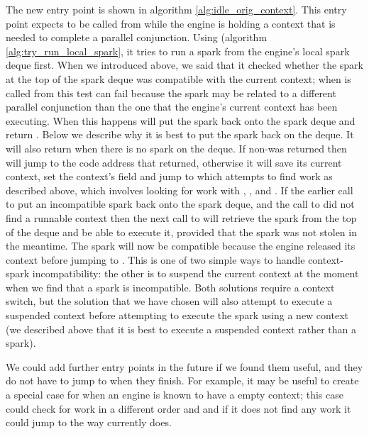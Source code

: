 The new entry point \idleorigcontext is shown in algorithm
\ref{alg:idle_orig_context}.
This entry point expects to be called from \joinandcontinue while the engine
is holding a context that is needed to complete a parallel conjunction.
Using \tryrunlocalspark (algorithm \ref{alg:try_run_local_spark},
it tries to run a spark from the engine's local spark deque first.
When we introduced \tryrunlocalspark above,
we said that it checked whether the spark at the top of the spark deque was
compatible with the current context;
when \tryrunlocalspark is called from \idleorigcontext this test can fail
because the spark may be related to a different parallel conjunction than
the one that the engine's current context has been executing.
When this happens \tryrunlocalspark will put the spark back onto the spark
deque and return \NULL.
Below we describe why it is best to put the spark back on the deque.
It will also return \NULL when there is no spark on the deque.
If non-\NULL was returned then \idleorigcontext will jump to the code
address that \tryrunlocalspark returned,
otherwise it will save its current context,
set the context's  field
and jump to \idle which attempts to find work as described above,
which involves looking for work with \tryruncontext, \tryrunlocalspark, and
\trystealspark.
If the earlier call to \tryrunlocalspark put an incompatible spark back onto
the spark deque,
and the call to \tryruncontext did not find a runnable context then
the next call to \tryrunlocalspark
will retrieve the spark from the top of the deque and be able to execute it,
provided that the spark was not stolen in the meantime.
The spark will now be compatible because the engine released its context
before jumping to \idle.
This is one of two simple ways to handle context-spark incompatibility:
the other is to suspend the current context at the moment when we find that
a spark is incompatible.
Both solutions require a context switch,
but the solution that we have chosen will also attempt to execute a
suspended context before attempting to execute the spark using a new context
(we described above that it is best to execute a suspended context rather
than a spark).

We could add further entry points in the future if we found them useful,
and they do not have to jump to \idle when they finish.
For example,
it may be useful to create a special case for when an engine is known to
have a empty context;
this case could check for work in a different order and and if it does not
find any work it could jump to \sleep the way \idle currently does.

